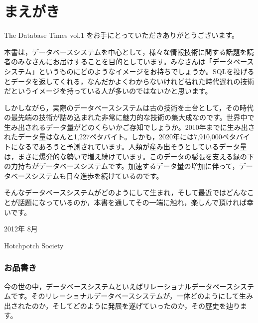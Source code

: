
\chapter*{まえがき}
\thispagestyle{plainhead}

The Database Times vol.1 をお手にとっていただきありがとうございます。

本書は，データベースシステムを中心として，様々な情報技術に関する話題を読者のみなさんにお届けすることを目的としています。みなさんは「データベースシステム」というものにどのようなイメージをお持ちでしょうか。SQLを投げるとデータを返してくれる，なんだかよくわからないけれど枯れた時代遅れの技術だというイメージを持っている人が多いのではないかと思います。

しかしながら，実際のデータベースシステムは古の技術を土台として，その時代の最先端の技術が詰め込まれた非常に魅力的な技術の集大成なのです。世界中で生み出されるデータ量がどのくらいかご存知でしょうか。2010年までに生み出されたデータ量はなんと1,227ペタバイト。しかも，2020年には7,910,000ペタバイトになるであろうと予測されています。人類が産み出そうとしているデータ量は，まさに爆発的な勢いで増え続けています。このデータの膨張を支える縁の下の力持ちがデータベースシステムです。加速するデータ量の増加に伴って，データベースシステムも日々進歩を続けているのです。

そんなデータベースシステムがどのようにして生まれ，そして最近ではどんなことが話題になっているのか，本書を通してその一端に触れ，楽しんで頂ければ幸いです。

\begin{flushright}
 2012年 8月

Hotchpotch Society
\end{flushright}

\newpage

\subsection*{お品書き}


今の世の中，データベースシステムといえばリレーショナルデータベースシステムです。そのリレーショナルデータベースシステムが，一体どのようにして生み出されたのか，そしてどのように発展を遂げていったのか，その歴史を辿ります。

\vspace*{\Cvs}


